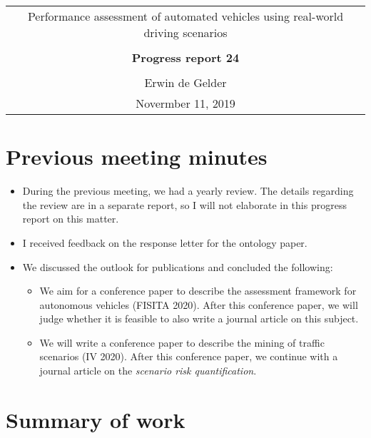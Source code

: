 \documentclass[10pt,final,a4paper,oneside,onecolumn]{article}
\newcommand{\progressreportnumber}{24}
\renewcommand{\author}{Erwin de Gelder}
\renewcommand{\date}{Novermber 11, 2019}
\renewcommand{\title}{Performance assessment of automated vehicles using real-world driving scenarios}
\begin{document}
	
\begin{center}
	\begin{tabular}{c}
		\title \\ \\
		\textbf{\huge Progress report \progressreportnumber} \\ \\
		\author \\ 
		\date
	\end{tabular}
\end{center}

\section{Previous meeting minutes}

\begin{itemize}
	\item During the previous meeting, we had a yearly review. The details regarding the review are in a separate report, so I will not elaborate in this progress report on this matter.
	\item I received feedback on the response letter for the ontology paper. 
	\item We discussed the outlook for publications and concluded the following:
	\begin{itemize}
		\item We aim for a conference paper to describe the assessment framework for autonomous vehicles (FISITA 2020). After this conference paper, we will judge whether it is feasible to also write a journal article on this subject. 
		\item We will write a conference paper to describe the mining of traffic scenarios (IV 2020). After this conference paper, we continue with a journal article on the \emph{scenario risk quantification}.
	\end{itemize}
\end{itemize}

\section{Summary of work}
\end{document}
